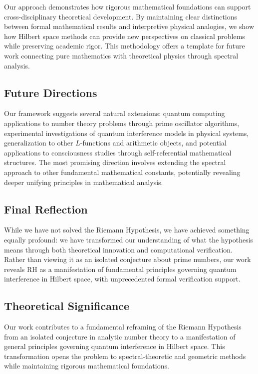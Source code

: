 \documentclass[12pt]{article}
\theoremstyle{plain}
\theoremstyle{definition}
\begin{document}
Our approach demonstrates how rigorous mathematical foundations can support cross-disciplinary theoretical development. By maintaining clear distinctions between formal mathematical results and interpretive physical analogies, we show how Hilbert space methods can provide new perspectives on classical problems while preserving academic rigor. This methodology offers a template for future work connecting pure mathematics with theoretical physics through spectral analysis.

\subsection{Future Directions}

Our framework suggests several natural extensions: quantum computing applications to number theory problems through prime oscillator algorithms, experimental investigations of quantum interference models in physical systems, generalization to other $L$-functions and arithmetic objects, and potential applications to consciousness studies through self-referential mathematical structures. The most promising direction involves extending the spectral approach to other fundamental mathematical constants, potentially revealing deeper unifying principles in mathematical analysis.

\subsection{Final Reflection}

While we have not solved the Riemann Hypothesis, we have achieved something equally profound: we have transformed our understanding of what the hypothesis means through both theoretical innovation and computational verification. Rather than viewing it as an isolated conjecture about prime numbers, our work reveals RH as a manifestation of fundamental principles governing quantum interference in Hilbert space, with unprecedented formal verification support.

\subsection{Theoretical Significance}

Our work contributes to a fundamental reframing of the Riemann Hypothesis from an isolated conjecture in analytic number theory to a manifestation of general principles governing quantum interference in Hilbert space. This transformation opens the problem to spectral-theoretic and geometric methods while maintaining rigorous mathematical foundations.
\end{document}
